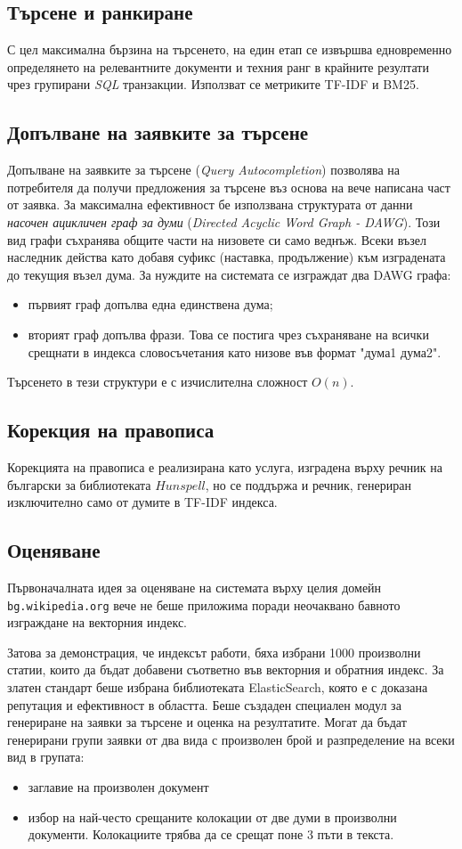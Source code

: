 \documentclass[a4paper,12pt]{article} \usepackage[utf8]{inputenc}
\begin{document}
\subsection{Търсене и ранкиране} С цел максимална бързина на търсенето, на един
етап се извършва едновременно определянето на релевантните документи и техния
ранг в крайните резултати чрез групирани \emph{SQL} транзакции. Използват се
метриките TF-IDF и BM25.

\subsection{Допълване на заявките за търсене} Допълване на заявките за търсене
(\emph{Query Autocompletion}) позволява на потребителя да получи предложения за
търсене въз основа на вече написана част от заявка. За максимална ефективност бе
използвана структурата от данни \emph{насочен ацикличен граф за думи}
(\emph{Directed Acyclic Word Graph - DAWG}). Този вид графи съхранява общите
части на низовете си само веднъж. Всеки възел наследник действа като добавя
суфикс (наставка, продължение) към изградената до текущия възел дума. За нуждите
на системата се изграждат два DAWG графа: \begin{itemize} \item първият граф
допълва една единствена дума; \item вторият граф допълва фрази. Това се постига
чрез съхраняване на всички срещнати в индекса словосъчетания като низове във
формат "дума1 дума2". \end{itemize} Търсенето в тези структури е с изчислителна
сложност $O(n)$. \subsection{Корекция на правописа} Корекцията на правописа е
реализирана като услуга, изградена върху речник на български за библиотеката
$Hunspell$, но се поддържа и речник, генериран изключително само от думите в
TF-IDF индекса. \subsection{Оценяване} Първоначалната идея за оценяване на
системата върху целия домейн \texttt{bg.wikipedia.org} вече не беше приложима
поради неочаквано бавното изграждане на векторния индекс.

Затова за демонстрация, че индексът работи, бяха избрани 1000 произволни статии,
които да бъдат добавени съответно във векторния и обратния индекс. За златен
стандарт беше избрана библиотеката ElasticSearch, която е с доказана репутация и
ефективност в областта. Беше създаден специален модул за генериране на заявки за
търсене и оценка на резултатите. Могат да бъдат генерирани групи заявки от два
вида с произволен брой и разпределение на всеки вид в групата: \begin{itemize}
\item заглавие на произволен документ \item избор на най-често срещаните
колокации от две думи в произволни документи. Колокациите трябва да се срещат
поне 3 пъти в текста. \end{itemize}
\end{document}
